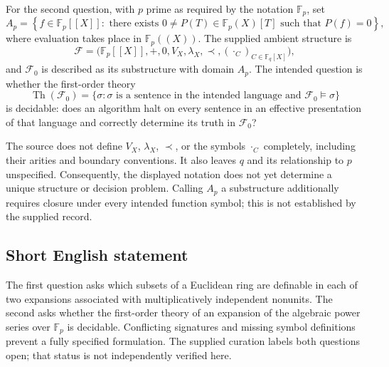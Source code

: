 \documentclass[11pt]{article}
\begin{document}
For the second question, with \(p\) prime as required by the notation \(\mathbb F_p\), set
\[
A_p=\left\{f\in\mathbb F_p[[X]]:\text{ there exists }0\ne P(T)\in\mathbb F_p(X)[T]\text{ such that }P(f)=0\right\},
\]
where evaluation takes place in \(\mathbb F_p((X))\). The supplied ambient structure is
\[
\mathcal F=\bigl(\mathbb F_p[[X]],+,0,V_X,\lambda_X,\prec,(\mathbin{\cdot_C})_{C\in\mathbb F_q[X]}\bigr),
\]
and \(\mathcal F_0\) is described as its substructure with domain \(A_p\). The intended question is whether the first-order theory
\[
\operatorname{Th}(\mathcal F_0)=\{\sigma:\sigma\text{ is a sentence in the intended language and }\mathcal F_0\models\sigma\}
\]
is decidable: does an algorithm halt on every sentence in an effective presentation of that language and correctly determine its truth in \(\mathcal F_0\)?

The source does not define \(V_X\), \(\lambda_X\), \(\prec\), or the symbols \(\mathbin{\cdot_C}\) completely, including their arities and boundary conventions. It also leaves \(q\) and its relationship to \(p\) unspecified. Consequently, the displayed notation does not yet determine a unique structure or decision problem. Calling \(A_p\) a substructure additionally requires closure under every intended function symbol; this is not established by the supplied record.
\subsection{Short English statement}
The first question asks which subsets of a Euclidean ring are definable in each of two expansions associated with multiplicatively independent nonunits. The second asks whether the first-order theory of an expansion of the algebraic power series over \(\mathbb F_p\) is decidable. Conflicting signatures and missing symbol definitions prevent a fully specified formulation. The supplied curation labels both questions open; that status is not independently verified here.
\end{document}
